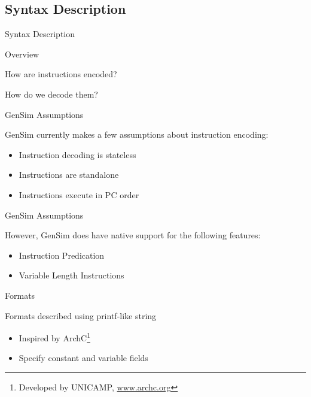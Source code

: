 \subsection{Syntax Description}

\begin{frame}{Syntax Description}
\usebox{\modelcomponentsbox}
\end{frame}

\begin{frame}{Overview}

How are instructions encoded?

How do we decode them?

\end{frame}

\begin{frame}{GenSim Assumptions}

GenSim currently makes a few assumptions about instruction encoding:
\begin{itemize}
\item Instruction decoding is stateless
\item Instructions are standalone
\item Instructions execute in PC order
\end{itemize}

\end{frame}

\begin{frame}{GenSim Assumptions}

However, GenSim does have native support for the following features:
\begin{itemize}
\item Instruction Predication
\item Variable Length Instructions
\end{itemize}

\end{frame}


\begin{frame}{Formats}

Formats described using printf-like string
\begin{itemize}
\item Inspired by ArchC\footnote{Developed by UNICAMP, \url{www.archc.org}}
\item Specify constant and variable fields
\end{itemize}

\end{frame}

